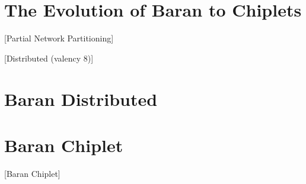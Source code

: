\documentclass[../../../OAE-SPEC-MAIN.tex]{subfiles}
\begin{document}
 
\section{The Evolution of Baran to Chiplets}

[Partial Network Partitioning]

[Distributed (valency 8)]
  
\section{Baran Distributed}

\section{Baran Chiplet}

[Baran Chiplet]







\end{document}
